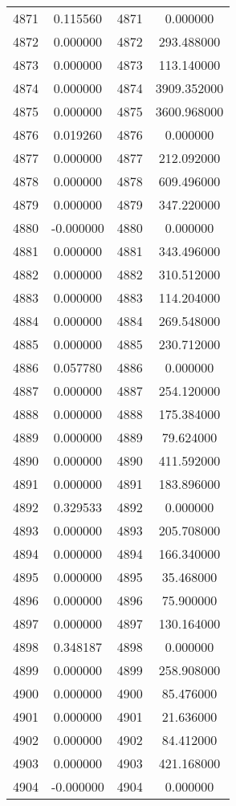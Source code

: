 \documentclass[12pt]{article}
\begin{document}
\begin{longtable}{@{}cccc@{}}
4871 & 0.115560 & 4871 & 0.000000 \\
4872 & 0.000000 & 4872 & 293.488000 \\
4873 & 0.000000 & 4873 & 113.140000 \\
4874 & 0.000000 & 4874 & 3909.352000 \\
4875 & 0.000000 & 4875 & 3600.968000 \\
4876 & 0.019260 & 4876 & 0.000000 \\
4877 & 0.000000 & 4877 & 212.092000 \\
4878 & 0.000000 & 4878 & 609.496000 \\
4879 & 0.000000 & 4879 & 347.220000 \\
4880 & -0.000000 & 4880 & 0.000000 \\
4881 & 0.000000 & 4881 & 343.496000 \\
4882 & 0.000000 & 4882 & 310.512000 \\
4883 & 0.000000 & 4883 & 114.204000 \\
4884 & 0.000000 & 4884 & 269.548000 \\
4885 & 0.000000 & 4885 & 230.712000 \\
4886 & 0.057780 & 4886 & 0.000000 \\
4887 & 0.000000 & 4887 & 254.120000 \\
4888 & 0.000000 & 4888 & 175.384000 \\
4889 & 0.000000 & 4889 & 79.624000 \\
4890 & 0.000000 & 4890 & 411.592000 \\
4891 & 0.000000 & 4891 & 183.896000 \\
4892 & 0.329533 & 4892 & 0.000000 \\
4893 & 0.000000 & 4893 & 205.708000 \\
4894 & 0.000000 & 4894 & 166.340000 \\
4895 & 0.000000 & 4895 & 35.468000 \\
4896 & 0.000000 & 4896 & 75.900000 \\
4897 & 0.000000 & 4897 & 130.164000 \\
4898 & 0.348187 & 4898 & 0.000000 \\
4899 & 0.000000 & 4899 & 258.908000 \\
4900 & 0.000000 & 4900 & 85.476000 \\
4901 & 0.000000 & 4901 & 21.636000 \\
4902 & 0.000000 & 4902 & 84.412000 \\
4903 & 0.000000 & 4903 & 421.168000 \\
4904 & -0.000000 & 4904 & 0.000000 \\

\end{longtable}
\end{document}
